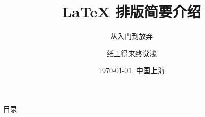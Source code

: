 \documentclass[10pt, aspectratio=169]{ctexbeamer}
\title{ \LaTeX{} 排版简要介绍 }
\subtitle{从入门到放弃}
\author[Haiwen\,Zhang]{\href{mailto:haiwen.zhang@zju.edu.cn}{纸上得来终觉浅}}
\institute{数理学院数学系}
\date[\today]{\today, 中国上海}
\begin{document}
\begin{frame}[plain]
  \maketitle
\end{frame}

\begin{frame}[t]{目录}
  \begin{multicols}{2}
      \tableofcontents
  \end{multicols}
\end{frame}












\end{document}
